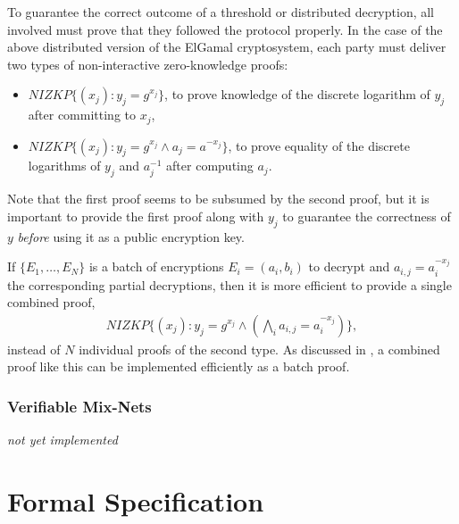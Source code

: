 \documentclass[bibtotoc,halfparskip,oneside]{scrreprt}
\begin{document}
	To guarantee the correct outcome of a threshold or distributed decryption, all involved must prove that they followed the protocol properly. In the case of the above distributed version of the ElGamal cryptosystem, each party must deliver two types of non-interactive zero-knowledge proofs:
	\begin{itemize}
		\item $\mathit{NIZKP}\{(x_j):y_j=g^{x_j}\}$, to prove knowledge of the discrete logarithm of $y_j$ after committing to $x_j$,
		\item $\mathit{NIZKP}\{(x_j):y_j=g^{x_j} \wedge a_j=a^{-x_j}\}$, to prove equality of the discrete logarithms of $y_j$ and $a_j^{-1}$ after computing $a_j$.
	\end{itemize}
	Note that the first proof seems to be subsumed by the second proof, but it is important to provide the first proof along with $y_j$ to guarantee the correctness of $y$ \emph{before} using it as a public encryption key.
	
	If $\{E_1,\ldots,E_N\}$ is a batch of encryptions $E_i=(a_i,b_i)$ to decrypt and $a_{i,j}=a_i^{-x_j}$ the corresponding partial decryptions, then it is more efficient to provide a single combined  proof,
	\begin{align}
		\mathit{NIZKP}\{(x_j):y_j=g^{x_j} \wedge (\bigwedge_i a_{i,j}=a_i^{-x_j})\},
	\end{align}
	instead of $N$ individual proofs of the second type. As discussed in , a combined proof like this can be implemented efficiently as a batch proof.
	
	\section{Verifiable Mix-Nets}
	
	\emph{not yet implemented}
	
	
	\part{Formal Specification}
	
	
\end{document}
